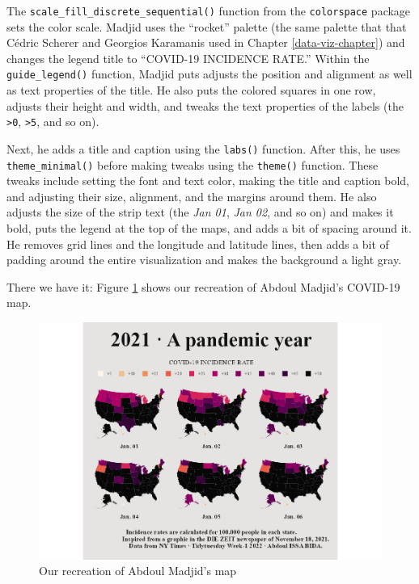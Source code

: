 \documentclass[
]{book}
\begin{document}
The \texttt{scale\_fill\_discrete\_sequential()} function from the \texttt{colorspace} package sets the color scale. Madjid uses the ``rocket'' palette (the same palette that that Cédric Scherer and Georgios Karamanis used in Chapter \ref{data-viz-chapter}) and changes the legend title to ``COVID-19 INCIDENCE RATE.'' Within the \texttt{guide\_legend()} function, Madjid puts adjusts the position and alignment as well as text properties of the title. He also puts the colored squares in one row, adjusts their height and width, and tweaks the text properties of the labels (the \texttt{\textgreater{}0}, \texttt{\textgreater{}5}, and so on).

Next, he adds a title and caption using the \texttt{labs()} function. After this, he uses \texttt{theme\_minimal()} before making tweaks using the \texttt{theme()} function. These tweaks include setting the font and text color, making the title and caption bold, and adjusting their size, alignment, and the margins around them. He also adjusts the size of the strip text (the \emph{Jan 01}, \emph{Jan 02}, and so on) and makes it bold, puts the legend at the top of the maps, and adds a bit of spacing around it. He removes grid lines and the longitude and latitude lines, then adds a bit of padding around the entire visualization and makes the background a light gray.

There we have it: Figure \ref{fig:final-map-map} shows our recreation of Abdoul Madjid's COVID-19 map.

\begin{figure}
\includegraphics[width=1\linewidth]{maps_files/figure-latex/final-map-map-1} \caption{Our recreation of Abdoul Madjid's map}\label{fig:final-map-map}
\end{figure}
\end{document}
